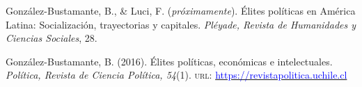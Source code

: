 





\begin{publications}

\begin{benumerate}{2}

\item{\small Gonz\'alez-Bustamante, B., \& Luci, F. ({\itshape próximamente}). Élites políticas en América Latina: Socialización, trayectorias y capitales. {\itshape Pléyade, Revista de Humanidades y Ciencias Sociales}, 28.}\vspace{1mm}

\item{\small Gonz\'alez-Bustamante, B. (2016). Élites políticas, económicas e intelectuales. {\itshape Pol\'itica, Revista de Ciencia Pol\'itica, 54}(1). {\scshape url}: \href{https://revistapolitica.uchile.cl/index.php/RP/issue/view/4365}{\textcolor{blue}{https://revistapolitica.uchile.cl}}}\vspace{1mm}

\end{benumerate}

\end{publications}
